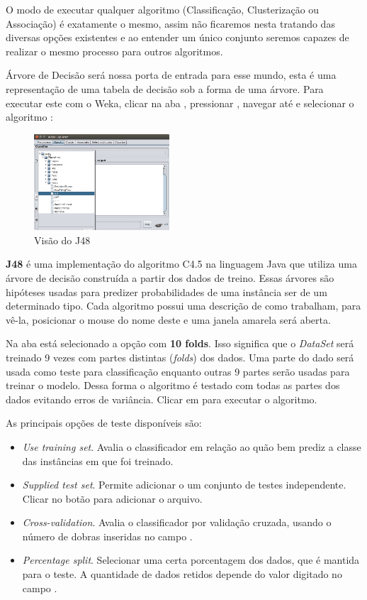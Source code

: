 \documentclass[a4paper,11pt]{article}
\begin{document}
O modo de executar qualquer algoritmo (Classificação, Clusterização ou Associação) é exatamente o mesmo, assim não ficaremos nesta tratando das diversas opções existentes e ao entender um único conjunto seremos capazes de realizar o mesmo processo para outros algoritmos.

Árvore de Decisão será nossa porta de entrada para esse mundo, esta é uma representação de uma tabela de decisão sob a forma de uma árvore. Para executar este com o Weka, clicar na aba , pressionar , navegar até  e selecionar o algoritmo :
\begin{figure}[H]
	\centering
	\includegraphics[width=0.45\textwidth]{imagem/weka-algoritmo-j48.png}
	\caption{Visão do J48}
\end{figure}

\textbf{J48} é uma implementação do algoritmo C4.5 na linguagem Java que utiliza uma árvore de decisão construída a partir dos dados de treino. Essas árvores são hipóteses usadas para predizer probabilidades de uma instância ser de um determinado tipo. Cada algoritmo possui uma descrição de como trabalham, para vê-la, posicionar o mouse do nome deste e uma janela amarela será aberta.

Na aba  está selecionado a opção  com \textbf{10 folds}. Isso significa que o \textit{DataSet} será treinado 9 vezes com partes distintas (\textit{folds}) dos dados. Uma parte do dado será usada como teste para classificação enquanto outras 9 partes serão usadas para treinar o modelo. Dessa forma o algoritmo é testado com todas as partes dos dados evitando erros de variância. Clicar em  para executar o algoritmo.

As principais opções de teste disponíveis são: \vspace{-1em}
\begin{itemize}[nolistsep]
	\item \textit{Use training set}. Avalia o classificador em relação ao quão bem prediz a classe das instâncias em que foi treinado. 
	\item \textit{Supplied test set}. Permite adicionar o um conjunto de testes independente. Clicar no botão  para adicionar o arquivo.
	\item \textit{Cross-validation}. Avalia o classificador por validação cruzada, usando o número de dobras inseridas no campo . 
	\item \textit{Percentage split}. Selecionar uma certa porcentagem dos dados, que é mantida para o teste. A quantidade de dados retidos depende do valor digitado no campo \opcbotao{\%}.
\end{itemize}
\end{document}
